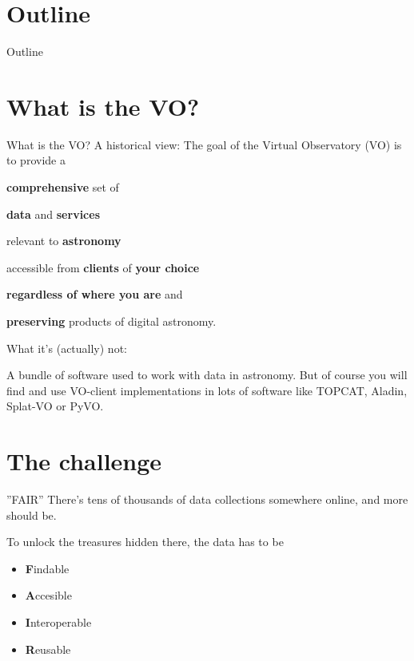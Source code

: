 \documentclass{beamer}
\title{}
\author{Dave Morris, Hendrik Heinl}
\institute{University of Edinburgh, CDS/CNRS}
\begin{document}
\begin{frame}
\titlepage
\end{frame}

\section*{Outline}
\begin{frame}{Outline}
\tableofcontents
\end{frame}

\section{What is the VO?}
\begin{frame}{What is the VO?}
A historical view: The goal of the Virtual Observatory (VO) is to provide a
\newline
\newline
\centerline{\textbf{comprehensive} set of}
\centerline{\textbf{data} and \textbf{services}}
\centerline{relevant to \textbf{astronomy}}
\centerline{accessible from \textbf{clients} of \textbf{your choice}}
\centerline{\textbf{regardless of where you are} and}
\centerline{\textbf{preserving} products of digital astronomy.}
\end{frame}

\begin{frame}{What it's (actually) not:}

A bundle of software used to work with data in astronomy. 
\newline
\newline
But of course you will find and use VO-client implementations in lots of
software like TOPCAT, Aladin, Splat-VO or PyVO. 

\end{frame}


\section{The challenge}

\begin{frame}{''FAIR''}
There's tens of thousands of data collections somewhere online,
and more should be.

To unlock the treasures hidden there, the data has to be
\begin{itemize}
\item \textbf{F}indable
\item \textbf{A}ccesible
\item \textbf{I}nteroperable
\item \textbf{R}eusable
\end{itemize}
\end{frame}
\end{document}
